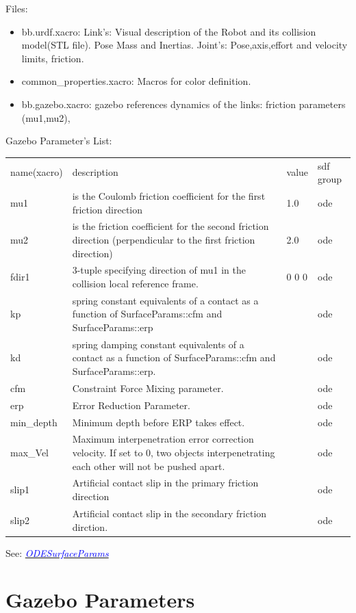 \documentclass[twoside,colorback,accentcolor=tud4c,11pt]{tudreport}
\newcommand{\mylink}[2] {	\href{#1}{	\textit{\textcolor{blue}{#2}}}}
\begin{document}
Files:
\begin{itemize}
	\item bb.urdf.xacro: Link's: Visual description of the Robot and its collision model(STL file). Pose Mass and Inertias. Joint's: Pose,axis,effort and velocity limits, friction.
	\item common\_properties.xacro: Macros for color definition.
	\item bb.gazebo.xacro: gazebo references dynamics of the links: friction parameters (mu1,mu2), 
\end{itemize}

Gazebo Parameter's List:\\
\begin{tabular}{l L{12cm} l l}
	name(xacro)&description&value&sdf group\\
	mu1&is the Coulomb friction coefficient for the first friction direction&1.0&ode\\
	mu2& is the friction coefficient for the second friction direction (perpendicular to the first friction direction)&2.0&ode\\
	fdir1& 3-tuple specifying direction of mu1 in the collision local reference frame.&0 0 0&ode\\
	kp&spring constant equivalents of a contact as a function of SurfaceParams::cfm and SurfaceParams::erp & &ode \\
	kd&spring damping constant equivalents of a contact as a function of SurfaceParams::cfm and SurfaceParams::erp.   & &ode \\
	cfm&Constraint Force Mixing parameter.& &ode \\
	erp&Error Reduction Parameter.& &ode \\
	min\_depth&Minimum depth before ERP takes effect.   & &ode \\
	max\_Vel& Maximum interpenetration error correction velocity.
	If set to 0, two objects interpenetrating each other will not be pushed apart.  & &ode \\
	slip1&Artificial contact slip in the primary friction direction  & &ode \\
	slip2&Artificial contact slip in the secondary friction dirction.& &ode \\
\end{tabular}

See: \mylink{http://osrf-distributions.s3.amazonaws.com/gazebo/api/dev/classgazebo_1_1physics_1_1ODESurfaceParams.html}{ODESurfaceParams}

\section{Gazebo Parameters}
\end{document}
